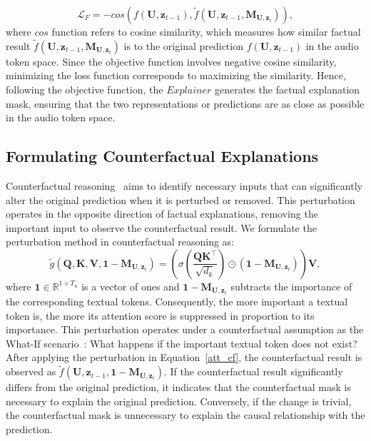 \begin{equation}
\mathcal{L}_{F} = -cos(f(\textbf{U}, \textbf{z}_{t-1}), \tilde{f}(\textbf{U}, \textbf{z}_{t-1}, \textbf{M}_{\textbf{U}, \textbf{z}_{t}})),
\label{fact}
\end{equation}
\noindent where $cos$ function refers to cosine similarity, which measures how similar factual result $\tilde{f}(\textbf{U}, \textbf{z}_{t-1}, \textbf{M}_{\textbf{U}, \textbf{z}_{t}})$ is to the original prediction $f(\textbf{U}, \textbf{z}_{t-1})$ in the audio token space. Since the objective function involves negative cosine similarity, minimizing the loss function corresponds to maximizing the similarity. Hence, following the objective function, the $Explainer$ generates the factual explanation mask, ensuring that the two representations or predictions are as close as possible in the audio token space.

\subsection{Formulating Counterfactual Explanations}
Counterfactual reasoning~\cite{tan2022learning, ali2023explainable, kenny2021post} aims to identify necessary inputs that can significantly alter the original prediction when it is perturbed or removed. This perturbation operates in the opposite direction of factual explanations, removing the important input to observe the counterfactual result. We formulate the perturbation method in counterfactual reasoning as:
\begin{equation}
\displaystyle \tilde{g}(\textbf{Q}, \textbf{K}, \textbf{V}, \textbf{1}-\textbf{M}_{\textbf{U}, \textbf{z}_{t}}) =  (\sigma(\frac{\textbf{Q}\textbf{K}^\intercal}{\sqrt{d_k}}) \odot (\textbf{1}-\textbf{M}_{\textbf{U}, \textbf{z}_{t}})) \textbf{V},
\label{att_cf}
\end{equation}
\noindent where $\textbf{1} \in \mathbb{R}^{1 \times T_{u}}$ is a vector of ones and $\textbf{1}-\textbf{M}_{\textbf{U}, \textbf{z}_{t}}$ subtracts the importance of the corresponding textual tokens. Consequently, the more important a textual token is, the more its attention score is suppressed in proportion to its importance. This perturbation operates under a counterfactual assumption as the What-If scenario~\cite{tan2022learning, ali2023explainable, kenny2021post}: What happens if the important textual token does not exist? After applying the perturbation in Equation~\eqref{att_cf}, the counterfactual result is observed as $\tilde{f}(\textbf{U}, \textbf{z}_{t-1}, \textbf{1}-\textbf{M}_{\textbf{U}, \textbf{z}_{t}})$. If the counterfactual result significantly differs from the original prediction, it indicates that the counterfactual mask is necessary to explain the original prediction. Conversely, if the change is trivial, the counterfactual mask is unnecessary to explain the causal relationship with the prediction. 

